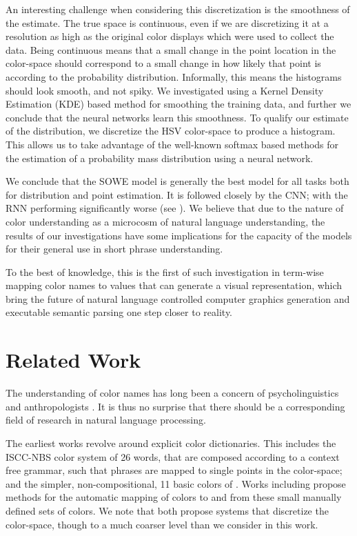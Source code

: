 \documentclass[]{clv3}
\newcommand{\parencite}{\citep}
\newcommand{\textcite}{\citet}
\newcommand{\datapairs}{$\langle\text{color-name},\,(h,s,v)\rangle$}
\begin{document}
An interesting challenge when considering this discretization is the smoothness of the estimate.
The true space is continuous, even if we are discretizing it at a resolution as high as the original color displays which were used to collect the data.
Being continuous means that a small change in the point location in the color-space should correspond to a small change in how likely that point is according to the probability distribution.
Informally, this means the histograms should look smooth, and not spiky.
We investigated using a Kernel Density Estimation (KDE) based method for smoothing the training data, and further we conclude that the neural networks learn this smoothness.
To qualify our estimate of the distribution, we discretize the HSV color-space to produce a histogram.
This allows us to take advantage of the well-known softmax based methods for the estimation of a probability mass distribution using a neural network.


We conclude that the SOWE model is generally the best model for all tasks both for distribution and point estimation.
It is followed closely by the CNN; with the RNN performing significantly worse (see ).
We believe that due to the nature of color understanding as a microcosm of natural language understanding, the results of our investigations have some implications for the capacity of the models for their general use in short phrase understanding.

To the best of knowledge, this is the first of such investigation in term-wise mapping color names to values that can generate a visual representation, which bring the future of natural language controlled computer graphics generation and executable semantic parsing one step closer to reality.  


\section{Related Work}\label{sec:related-work}
The understanding of color names has long been a concern of psycholinguistics and anthropologists \parencite{berlin1969basic,heider1972universals,HEIDER1972337,mylonas2015use}.
It is thus no surprise that there should be a corresponding field of research in natural language processing.

The earliest works revolve around explicit color dictionaries.
This includes the ISCC-NBS color system \parencite{kelly1955iscc} of 26 words, that are composed according to a context free grammar, such that phrases are mapped to single points in the color-space;
and the simpler, non-compositional, 11 basic colors of \textcite{berlin1969basic}.
Works including \textcite{Berk:1982:HFS:358589.358606,conway1992experimental,ele1994computational, mojsilovic2005computational, menegaz2007discrete,van2009learning}  propose methods for the automatic mapping of colors to and from these small manually defined sets of colors.
We note that \textcite{menegaz2007discrete,van2009learning} both propose systems that discretize the color-space, though to a much coarser level than we consider in this work.
\end{document}
